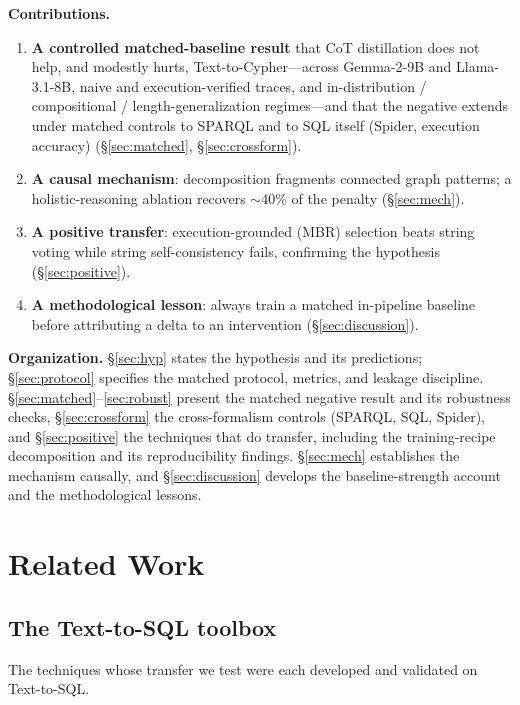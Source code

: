 \documentclass[11pt]{article}
\begin{document}
\noindent\textbf{Contributions.}
\begin{enumerate}[leftmargin=*]
  \item \textbf{A controlled matched-baseline result} that CoT distillation does not help, and
  modestly hurts, Text-to-Cypher---across Gemma-2-9B and Llama-3.1-8B, naive and execution-verified
  traces, and in-distribution / compositional / length-generalization regimes---and that the
  negative extends under matched controls to SPARQL and to SQL itself (Spider, execution accuracy)
  (\S\ref{sec:matched}, \S\ref{sec:crossform}).
  \item \textbf{A causal mechanism}: decomposition fragments connected graph patterns; a
  holistic-reasoning ablation recovers $\sim$40\% of the penalty (\S\ref{sec:mech}).
  \item \textbf{A positive transfer}: execution-grounded (MBR) selection beats string voting while
  string self-consistency fails, confirming the hypothesis (\S\ref{sec:positive}).
  \item \textbf{A methodological lesson}: always train a matched in-pipeline baseline before
  attributing a delta to an intervention (\S\ref{sec:discussion}).
\end{enumerate}

\noindent\textbf{Organization.} \S\ref{sec:hyp} states the hypothesis and its predictions;
\S\ref{sec:protocol} specifies the matched protocol, metrics, and leakage discipline.
\S\ref{sec:matched}--\ref{sec:robust} present the matched negative result and its robustness
checks, \S\ref{sec:crossform} the cross-formalism controls (SPARQL, SQL, Spider), and
\S\ref{sec:positive} the techniques that do transfer, including the training-recipe decomposition
and its reproducibility findings. \S\ref{sec:mech} establishes the mechanism causally, and
\S\ref{sec:discussion} develops the baseline-strength account and the methodological lessons.

\section{Related Work}
\subsection{The Text-to-SQL toolbox}
\label{sec:rw-sql}
The techniques whose transfer we test were each developed and validated on Text-to-SQL.
\end{document}

